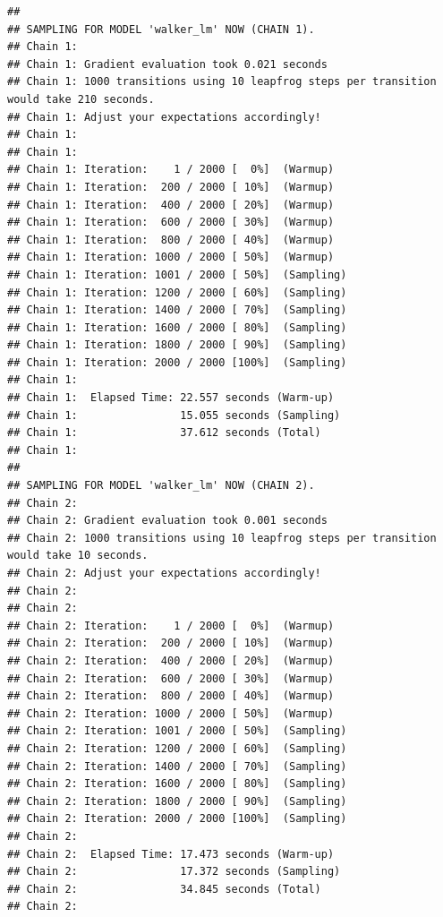 \documentclass[
]{book}
\newenvironment{Shaded}{\begin{snugshade}}{\end{snugshade}}
\newcommand{\AttributeTok}[1]{\textcolor[rgb]{0.77,0.63,0.00}{#1}}
\newcommand{\CommentTok}[1]{\textcolor[rgb]{0.56,0.35,0.01}{\textit{#1}}}
\newcommand{\DecValTok}[1]{\textcolor[rgb]{0.00,0.00,0.81}{#1}}
\newcommand{\FloatTok}[1]{\textcolor[rgb]{0.00,0.00,0.81}{#1}}
\newcommand{\FunctionTok}[1]{\textcolor[rgb]{0.00,0.00,0.00}{#1}}
\newcommand{\NormalTok}[1]{#1}
\newcommand{\SpecialCharTok}[1]{\textcolor[rgb]{0.00,0.00,0.00}{#1}}
\newcommand{\StringTok}[1]{\textcolor[rgb]{0.31,0.60,0.02}{#1}}
\begin{document}
\begin{verbatim}
## 
## SAMPLING FOR MODEL 'walker_lm' NOW (CHAIN 1).
## Chain 1: 
## Chain 1: Gradient evaluation took 0.021 seconds
## Chain 1: 1000 transitions using 10 leapfrog steps per transition would take 210 seconds.
## Chain 1: Adjust your expectations accordingly!
## Chain 1: 
## Chain 1: 
## Chain 1: Iteration:    1 / 2000 [  0%]  (Warmup)
## Chain 1: Iteration:  200 / 2000 [ 10%]  (Warmup)
## Chain 1: Iteration:  400 / 2000 [ 20%]  (Warmup)
## Chain 1: Iteration:  600 / 2000 [ 30%]  (Warmup)
## Chain 1: Iteration:  800 / 2000 [ 40%]  (Warmup)
## Chain 1: Iteration: 1000 / 2000 [ 50%]  (Warmup)
## Chain 1: Iteration: 1001 / 2000 [ 50%]  (Sampling)
## Chain 1: Iteration: 1200 / 2000 [ 60%]  (Sampling)
## Chain 1: Iteration: 1400 / 2000 [ 70%]  (Sampling)
## Chain 1: Iteration: 1600 / 2000 [ 80%]  (Sampling)
## Chain 1: Iteration: 1800 / 2000 [ 90%]  (Sampling)
## Chain 1: Iteration: 2000 / 2000 [100%]  (Sampling)
## Chain 1: 
## Chain 1:  Elapsed Time: 22.557 seconds (Warm-up)
## Chain 1:                15.055 seconds (Sampling)
## Chain 1:                37.612 seconds (Total)
## Chain 1: 
## 
## SAMPLING FOR MODEL 'walker_lm' NOW (CHAIN 2).
## Chain 2: 
## Chain 2: Gradient evaluation took 0.001 seconds
## Chain 2: 1000 transitions using 10 leapfrog steps per transition would take 10 seconds.
## Chain 2: Adjust your expectations accordingly!
## Chain 2: 
## Chain 2: 
## Chain 2: Iteration:    1 / 2000 [  0%]  (Warmup)
## Chain 2: Iteration:  200 / 2000 [ 10%]  (Warmup)
## Chain 2: Iteration:  400 / 2000 [ 20%]  (Warmup)
## Chain 2: Iteration:  600 / 2000 [ 30%]  (Warmup)
## Chain 2: Iteration:  800 / 2000 [ 40%]  (Warmup)
## Chain 2: Iteration: 1000 / 2000 [ 50%]  (Warmup)
## Chain 2: Iteration: 1001 / 2000 [ 50%]  (Sampling)
## Chain 2: Iteration: 1200 / 2000 [ 60%]  (Sampling)
## Chain 2: Iteration: 1400 / 2000 [ 70%]  (Sampling)
## Chain 2: Iteration: 1600 / 2000 [ 80%]  (Sampling)
## Chain 2: Iteration: 1800 / 2000 [ 90%]  (Sampling)
## Chain 2: Iteration: 2000 / 2000 [100%]  (Sampling)
## Chain 2: 
## Chain 2:  Elapsed Time: 17.473 seconds (Warm-up)
## Chain 2:                17.372 seconds (Sampling)
## Chain 2:                34.845 seconds (Total)
## Chain 2:
\end{verbatim}

\begin{Shaded}
\end{Shaded}
\end{document}
